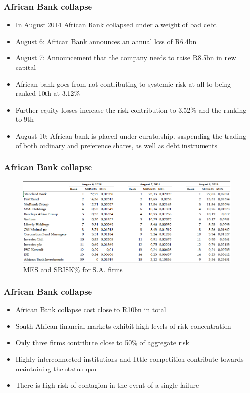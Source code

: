 \documentclass[11pt]{beamer}
\begin{document}

\begin{frame}
\frametitle{African Bank collapse}
\begin{itemize}
\item In August 2014 African Bank collapsed under a weight of bad debt
\item August 6: African Bank announces an annual loss of R6.4bn
\item August 7: Announcement that the company needs to raise R8.5bn in new capital
\item African bank goes from not contributing to systemic risk at all to being ranked 10th at 3.12\%
\item Further equity losses increase the risk contribution to 3.52\% and the ranking to 9th
\item August 10: African bank is placed under curatorship, suspending the trading of both ordinary and preference shares, as well as debt instruments
\end{itemize}
\end{frame}


\begin{frame}
\frametitle{African Bank collapse}
\begin{figure}
\includegraphics[width=\textwidth]{srisk4.png}
\caption{MES and SRISK\% for S.A. firms}
\end{figure}
\end{frame}


\begin{frame}
\frametitle{African Bank collapse}
\begin{itemize}
\item African Bank collapse cost close to R10bn in total
\item South African financial markets exhibit high levels of risk concentration
\item Only three firms contribute close to 50\% of aggregate risk
\item Highly interconnected institutions and little competition contribute towards maintaining the status quo
\item There is high risk of contagion in the event of a single failure
\end{itemize}
\end{frame}
\end{document}
